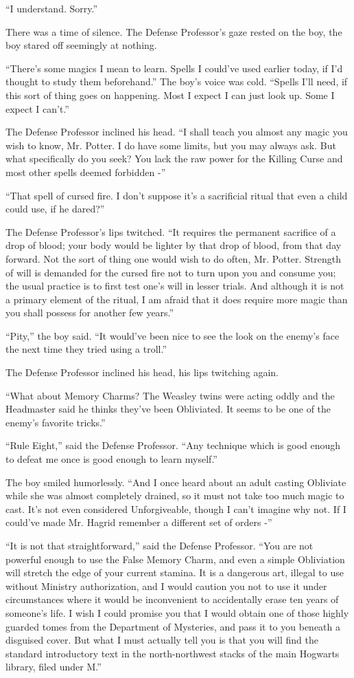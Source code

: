 ``I understand. Sorry.''

There was a time of silence. The Defense Professor's gaze rested on the
boy, the boy stared off seemingly at nothing.

``There's some magics I mean to learn. Spells I could've used earlier
today, if I'd thought to study them beforehand.'' The boy's voice was
cold. ``Spells I'll need, if this sort of thing goes on happening. Most
I expect I can just look up. Some I expect I can't.''

The Defense Professor inclined his head. ``I shall teach you almost any
magic you wish to know, Mr. Potter. I do have some limits, but you may
always ask. But what specifically do you seek? You lack the raw power
for the Killing Curse and most other spells deemed forbidden -''

``That spell of cursed fire. I don't suppose it's a sacrificial ritual
that even a child could use, if he dared?''

The Defense Professor's lips twitched. ``It requires the permanent
sacrifice of a drop of blood; your body would be lighter by that drop of
blood, from that day forward. Not the sort of thing one would wish to do
often, Mr. Potter. Strength of will is demanded for the cursed fire not
to turn upon you and consume you; the usual practice is to first test
one's will in lesser trials. And although it is not a primary element of
the ritual, I am afraid that it does require more magic than you shall
possess for another few years.''

``Pity,'' the boy said. ``It would've been nice to see the look on the
enemy's face the next time they tried using a troll.''

The Defense Professor inclined his head, his lips twitching again.

``What about Memory Charms? The Weasley twins were acting oddly and the
Headmaster said he thinks they've been Obliviated. It seems to be one of
the enemy's favorite tricks.''

``Rule Eight,'' said the Defense Professor. ``Any technique which is
good enough to defeat me once is good enough to learn myself.''

The boy smiled humorlessly. ``And I once heard about an adult casting
Obliviate while she was almost completely drained, so it must not take
too much magic to cast. It's not even considered Unforgiveable, though I
can't imagine why not. If I could've made Mr. Hagrid remember a
different set of orders -''

``It is not that straightforward,'' said the Defense Professor. ``You
are not powerful enough to use the False Memory Charm, and even a simple
Obliviation will stretch the edge of your current stamina. It is a
dangerous art, illegal to use without Ministry authorization, and I
would caution you not to use it under circumstances where it would be
inconvenient to accidentally erase ten years of someone's life. I wish I
could promise you that I would obtain one of those highly guarded tomes
from the Department of Mysteries, and pass it to you beneath a disguised
cover. But what I must actually tell you is that you will find the
standard introductory text in the north-northwest stacks of the main
Hogwarts library, filed under M.''

